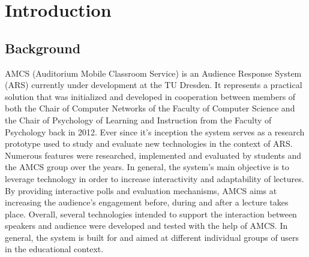 
\chapter{Introduction}

\section{Background}

AMCS (Auditorium Mobile Classroom Service) is an Audience Response System (ARS) currently under development at the TU Dresden.
It represents a practical solution that was initialized and developed in cooperation between members of both the Chair of Computer Networks of the Faculty of Computer Science and the Chair of Psychology of Learning and Instruction from the Faculty of Psychology back in 2012. Ever since it's inception the system serves as a research prototype used to study and evaluate new technologies in the context of ARS. Numerous features were researched, implemented and evaluated by students and the AMCS group over the years.
\newline
\newline
In general, the system's main objective is to leverage technology in order to increase interactivity and adaptability of lectures. By providing interactive polls and evaluation mechanisms, AMCS aims at increasing the audience's engagement before, during and after a lecture takes place. Overall, several technologies intended to support the interaction between speakers and audience were developed and tested with the help of AMCS.
\newline
\newline
In general, the system is built for and aimed at different individual groups of users in the educational context.


